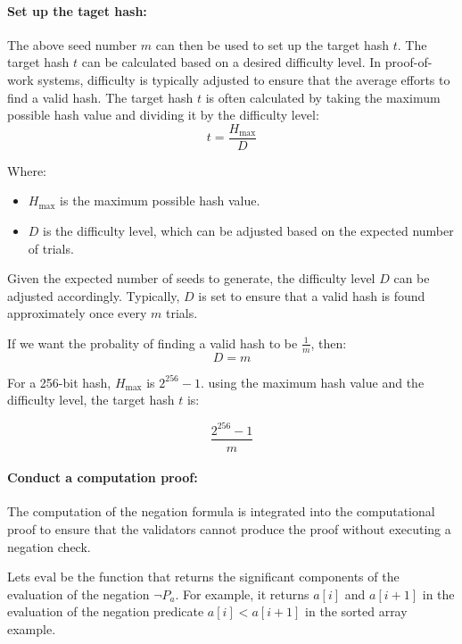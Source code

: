 \documentclass[runningheads]{llncs}
\begin{document}




\paragraph{Set up the taget hash:}
The above seed number $m$ can then be used to set up the target hash $t$. The target hash $t$ can be calculated based on a desired difficulty level. In proof-of-work systems, difficulty is typically adjusted to ensure that the average efforts to find a valid hash. The target hash $t$ is often calculated by taking the maximum possible hash value and dividing it by the difficulty level:
\[
t = \frac{H_{\text{max}}}{D}
\]

Where:
\begin{itemize}
  \item \( H_{\text{max}} \) is the maximum possible hash value.
  \item \( D \) is the difficulty level, which can be adjusted based on the expected number of trials.
\end{itemize}


Given the expected number of seeds to generate, 
the difficulty level $D$ can be adjusted accordingly. Typically, $D$ is set to ensure that a valid hash is found approximately once every $m$ trials.

If we want the probality of finding a valid hash to be $\frac{1}{m}$, then:
\[
D=m
\]

For a 256-bit hash, $H_{\text{max}}$ is $2^{256} - 1 $.  using the maximum hash value and the difficulty level, the target hash $t$ is:
    
\[
\frac{2^{256} - 1}{m}
\]
\paragraph{Conduct a computation proof:} The computation of the negation formula is integrated into the computational proof to ensure that the validators cannot produce the proof without executing a negation check.

Lets \(\text{eval}\) be the function that returns the significant components of the evaluation of the negation \(\neg P_{a}\).  For example, it returns \(a[i]\) and \(a[i + 1]\) in the evaluation of the negation predicate \(a[i] < a[i+1]\) in the sorted array example.
\end{document}
